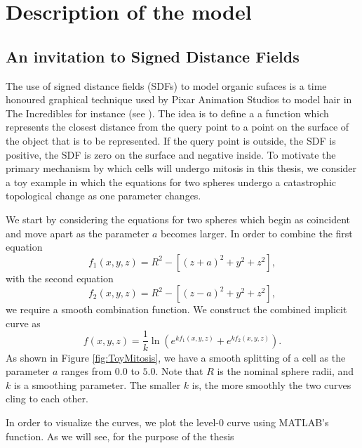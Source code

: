 \chapter{ Description of the model \label{ch:numero_uno}}
\section{An invitation to Signed Distance Fields}
The use of signed distance fields (SDFs) to model organic sufaces is a time honoured graphical technique used by Pixar Animation Studios to model hair 
in The Incredibles for instance (see \cite{petrovic2005volumetric}). The idea is to define a a function which represents the closest distance
from the query point to a point on the surface of the object that is to be represented. If the query point is outside, the SDF is positive,
 the SDF is zero on the surface and negative inside.
To motivate the primary mechanism by which cells will undergo mitosis in this thesis, we consider a toy example in which the equations for two spheres undergo a catastrophic topological change as one parameter changes.

We start by considering the equations for two spheres which begin as coincident and move apart as the parameter $a$ becomes larger. In order to combine the first equation
\begin{equation*}
f_1(x,y,z) = R^2 - \left[ (z+a)^2+y^2+z^2 \right],
\end{equation*}
with the second equation
\begin{equation*}
f_2(x,y,z) = R^2 - \left[ (z-a)^2+y^2+z^2 \right],
\end{equation*}
we require a smooth combination function. We construct the combined implicit curve as
\begin{equation*}
f(x,y,z) = \frac{1}{k}\ln{ \left( e^{k f_1(x,y,z)}+ e^{k f_2(x,y,z)} \right) }.
\end{equation*}
As shown in Figure \ref{fig:ToyMitosis}, we have a smooth splitting of a cell as the parameter $a$ ranges from $0.0$ to $5.0$. Note that $R$ is the nominal sphere radii, and $k$ is a smoothing parameter. The smaller $k$ is, the more smoothly the two curves cling to each other. 

In order to visualize the curves, we plot the level-$0$ curve using MATLAB's  function. As we will see, for the purpose of the thesis

